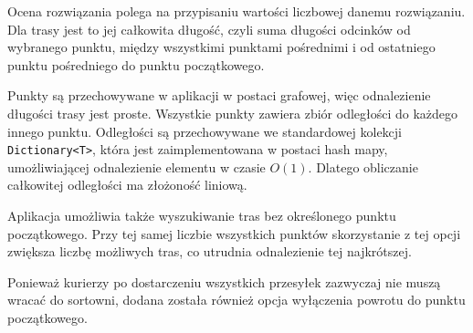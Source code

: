 Ocena rozwiązania polega na przypisaniu wartości liczbowej danemu rozwiązaniu. Dla trasy jest to jej całkowita długość, czyli suma długości odcinków od wybranego punktu, między wszystkimi punktami pośrednimi i od ostatniego punktu pośredniego do punktu początkowego.

Punkty są przechowywane w aplikacji w postaci grafowej, więc odnalezienie długości trasy jest proste. Wszystkie punkty zawiera zbiór odległości do każdego innego punktu. Odległości są przechowywane we standardowej kolekcji \texttt{Dictionary<T>}, która jest zaimplementowana w postaci hash mapy, umożliwiającej odnalezienie elementu w czasie $O(1)$. Dlatego obliczanie całkowitej odległości ma złożoność liniową.

Aplikacja umożliwia także wyszukiwanie tras bez określonego punktu początkowego. Przy tej samej liczbie wszystkich punktów skorzystanie z tej opcji zwiększa liczbę możliwych tras, co utrudnia odnalezienie tej najkrótszej. 

Ponieważ kurierzy po dostarczeniu wszystkich przesyłek zazwyczaj nie muszą wracać do sortowni, dodana została również opcja wyłączenia powrotu do punktu początkowego. 